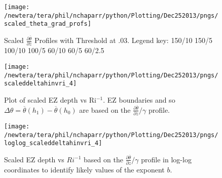 \begin{figure}[htbp]
    \centering
    \texttt{[image: /newtera/tera/phil/nchaparr/python/Plotting/Dec252013/pngs/scaled\_theta\_grad\_profs]}
    \caption{Scaled $\frac{\partial \overline{\theta}}{\partial z}$ Profiles with Threshold at .03. Legend key: {\color{red} } 150/10  150/5 \hspace{2mm} {\color{black} } 100/10 \hspace{2mm} {\color{black} } 100/5 \hspace{2mm} {\color{offyellow} } 60/10 \hspace{2mm} {\color{offyellow} } 60/5 \hspace{2mm} {\color{offyellow} } 60/2.5}
    \label{fig:thresh3}   %
\end{figure}

\begin{figure}[t]
    \centering
    \texttt{[image: /newtera/tera/phil/nchaparr/python/Plotting/Dec252013/pngs/scaleddeltahinvri\_4]}
    \caption[Scaled EZ Depth vs Ri$^{-1}$]{Plot of scaled EZ depth vs Ri$^{-1}$.  EZ  boundaries and so $\Delta \theta = \overline{\theta}(h_{1}) - \overline{\theta}(h_{0})$ are based on the $\frac{\partial \overline{\theta}}{\partial z}/\gamma$ profile.}
    \label{fig:deltahinvri_scaled}   %
\end{figure}                      
\vspace{-50mm}
\begin{figure}[b]
\centering
\texttt{[image: /newtera/tera/phil/nchaparr/python/Plotting/Dec252013/pngs/loglog\_scaleddeltahinvri\_4]}\\
\caption[Log-log Plot of scaled  EZ  Depth vs $Ri^{-1}$]{Scaled EZ  depth vs $Ri^{-1}$ based on the $\frac{\partial \overline{\theta}}{\partial z}/\gamma$ profile in log-log coordinates to identify likely values of the exponent $b$.}
\label{fig:loglogdeltahinvri}
\end{figure}
\clearpage

